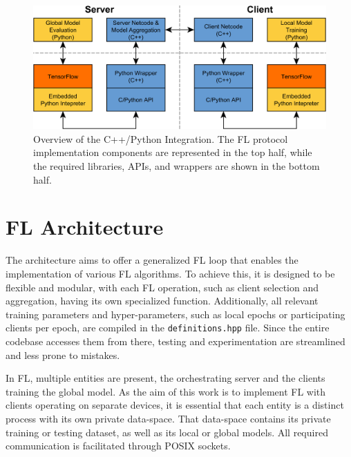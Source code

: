\begin{figure}[H]
    \centering
        \includegraphics[width=1\textwidth]{Images/block_diagrams/model_lifecycle.png}
        \decoRule
        \caption[C++/Python Integration]{Overview of the C++/Python Integration. The FL protocol implementation components are represented in the top half, while the required libraries, APIs, and wrappers are shown in the bottom half.}
        \label{fig:model_lifecycle}
\end{figure}

\section{FL Architecture}\label{sec:FL_architecture}
The architecture aims to offer a generalized FL loop that enables the implementation of various FL algorithms. To achieve this, it is designed to be flexible and modular, with each FL operation, such as client selection and aggregation, having its own specialized function. Additionally, all relevant training parameters and hyper-parameters, such as local epochs or participating clients per epoch, are compiled in the \texttt{definitions.hpp} file. Since the entire codebase accesses them from there, testing and experimentation are streamlined and less prone to mistakes.

In FL, multiple entities are present, the orchestrating server and the clients training the global model. As the aim of this work is to implement FL with clients operating on separate devices, it is essential that each entity is a distinct process with its own private data-space. That data-space contains its private training or testing dataset, as well as its local or global models. All required communication is facilitated through POSIX sockets.

